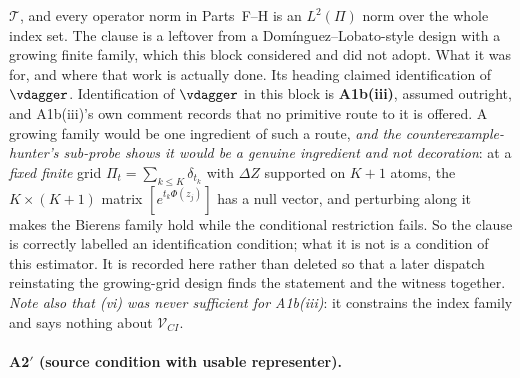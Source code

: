 \begin{enumerate}
$\mathcal T$, and every operator norm in Parts~F--H is an $L^{2}(\Pi)$ norm over the whole index set. The
clause is a leftover from a Dom\'inguez--Lobato-style design with a growing finite family, which this block
considered and did not adopt.
What it was for, and where that work is actually done. Its heading claimed identification of
$\vdagger$. Identification of $\vdagger$ in this block is \textbf{A1b(iii)}, assumed outright, and A1b(iii)'s
own comment records that no primitive route to it is offered. A growing family would be one ingredient of
such a route, \emph{and the counterexample-hunter's sub-probe shows it would be a genuine ingredient and
not decoration}: at a \emph{fixed finite} grid $\Pi_t=\sum_{k\le K}\delta_{t_k}$ with $\Delta Z$ supported on
$K+1$ atoms, the $K\times(K+1)$ matrix $[e^{t_k\Phi(z_j)}]$ has a null vector, and perturbing along it makes
the Bierens family hold while the conditional restriction fails. So the clause is correctly labelled an
identification condition; what it is not is a condition of this estimator. It is recorded here rather than
deleted so that a later dispatch reinstating the growing-grid design finds the statement and the witness
together. \emph{Note also that (vi) was never sufficient for A1b(iii)}: it constrains the index family and
says nothing about $\mathcal V_{CI}$.
\end{enumerate}

\paragraph{A2$'$ (source condition with usable representer).}

